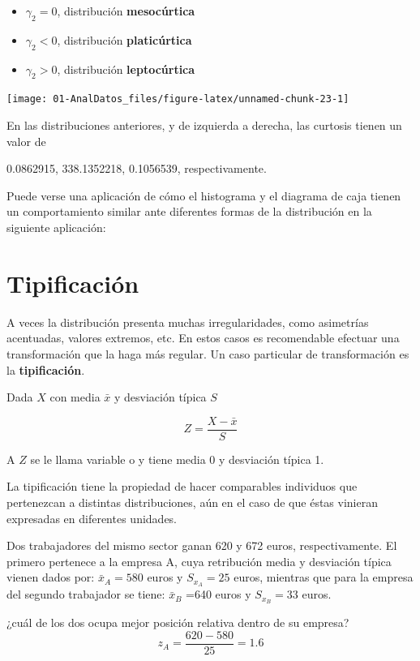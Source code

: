 \documentclass[]{book}
\theoremstyle{definition}
\theoremstyle{definition}
\theoremstyle{definition}
\theoremstyle{remark}
\begin{document}
\begin{itemize}
\item
  \(\gamma_2= 0\), distribución \textbf{mesocúrtica}
\item
  \(\gamma_2< 0\), distribución \textbf{platicúrtica}
\item
  \(\gamma_2> 0\), distribución \textbf{leptocúrtica}
\end{itemize}

\begin{center}\texttt{[image: 01-AnalDatos\_files/figure-latex/unnamed-chunk-23-1]} \end{center}

En las distribuciones anteriores, y de izquierda a derecha, las curtosis
tienen un valor de

0.0862915, 338.1352218, 0.1056539, respectivamente.

Puede verse una aplicación de cómo el histograma y el diagrama de caja
tienen un comportamiento similar ante diferentes formas de la
distribución en la siguiente aplicación:

\section{Tipificación}\label{tipificacion}

A veces la distribución presenta muchas irregularidades, como asimetrías
acentuadas, valores extremos, etc. En estos casos es recomendable
efectuar una transformación que la haga más regular. Un caso particular
de transformación es la \textbf{tipificación}.

Dada \(X\) con media \(\bar{x}\) y desviación típica \(S\)

\[Z  =  \frac{X  -  \bar{x}}{S}\]

A \(Z\) se le llama variable o y tiene media 0 y desviación típica 1.

La tipificación tiene la propiedad de hacer comparables individuos que
pertenezcan a distintas distribuciones, aún en el caso de que éstas
vinieran expresadas en diferentes unidades.

Dos trabajadores del mismo sector ganan 620 y 672 euros,
respectivamente. El primero pertenece a la empresa A, cuya retribución
media y desviación típica vienen dados por: \(\bar{x}_A= 580\) euros y
\(S_{x_A} = 25\) euros, mientras que para la empresa del segundo
trabajador se tiene: \(\bar{x}_B\) =640 euros y \(S_{x_B} = 33\) euros.

¿cuál de los dos ocupa mejor posición relativa dentro de su empresa?
\[z_A=\frac{620-580}{25}=1.6\]
\end{document}
